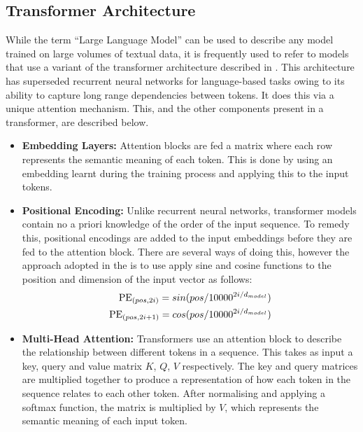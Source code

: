 \documentclass[12pt,twoside]{report}
\begin{document}
\subsection{Transformer Architecture}
While the term ``Large Language Model'' can be used to describe any model trained on large volumes of textual data, it is frequently used to refer to models that use a variant of the transformer architecture described in \cite{vaswani2017attention}.
This architecture has superseded recurrent neural networks for language-based tasks owing to its ability to capture long range dependencies between tokens.
It does this via a unique attention mechanism.
This, and the other components present in a transformer, are described below.
\begin{itemize}
  \item \textbf{Embedding Layers:} 
    Attention blocks are fed a matrix where each row represents the semantic meaning of each token. This is done by using an embedding learnt during the training process and applying this to the input tokens.
  \item \textbf{Positional Encoding:} 
    Unlike recurrent neural networks, transformer models contain no a priori knowledge of the order of the input sequence.
    To remedy this, positional encodings are added to the input embeddings before they are fed to the attention block.
    There are several ways of doing this, however the approach adopted in the \cite{vaswani2017attention} is to use apply sine and cosine functions to the position and dimension of the input vector as follows:
    \begin{equation*}
      \begin{split}
        \textnormal{PE}_{(pos, 2i)} = sin(pos/10000^{2i/d_{model}}) \\ 
        \textnormal{PE}_{(pos, 2i+1)} = cos(pos/10000^{2i/d_{model}})
      \end{split}
    \end{equation*}
  \item \textbf{Multi-Head Attention:}
    Transformers use an attention block to describe the relationship between different tokens in a sequence. 
    This takes as input a key, query and value matrix $K$, $Q$, $V$ respectively. 
    The key and query matrices are multiplied together to produce a representation of how each token in the sequence relates to each other token.
    After normalising and applying a softmax function, the matrix is multiplied by $V$, which represents the semantic meaning of each input token.
    \begin{equation*}

\end{equation*}
\end{itemize}
\end{document}
